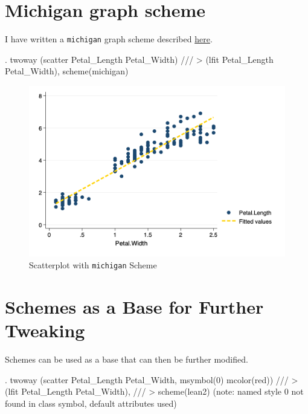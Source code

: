 \documentclass[
]{article}
\begin{document}
\hypertarget{michigan-graph-scheme}{%
\section{Michigan graph scheme}\label{michigan-graph-scheme}}

I have written a \texttt{michigan} graph scheme described
\href{https://agrogan1.github.io/Stata/}{here}.

\begin{stlog}
. twoway (scatter Petal_Length Petal_Width) /// 
> (lfit Petal_Length Petal_Width), scheme(michigan)
\end{stlog}



\begin{figure}
\centering
\includegraphics[width=0.75\linewidth]{michiganscatter.png}
\caption{Scatterplot with \texttt{michigan} Scheme}
\end{figure}

\hypertarget{schemes-as-a-base-for-further-tweaking}{%
\section{Schemes as a Base for Further
Tweaking}\label{schemes-as-a-base-for-further-tweaking}}

Schemes can be used as a base that can then be further modified.

\begin{stlog}
. twoway (scatter Petal_Length Petal_Width, msymbol(0) mcolor(red)) ///
> (lfit Petal_Length Petal_Width), ///
> scheme(lean2) 
(note:  named style 0 not found in class symbol, default attributes used)
\end{stlog}
\end{document}
